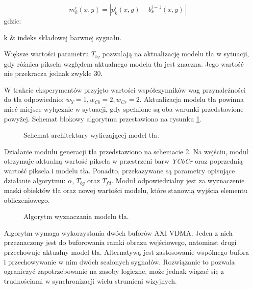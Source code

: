 \begin{enumerate}
	\begin{equation}
	\label{eq:background-model-background-mask-2}
	m^i_k(x,y) = | p^i_k(x,y) - b^{i-1}_k(x,y)|
	\end{equation}
	gdzie:
	\begin{conditions}
		k & indeks składowej barwnej sygnału. \\ 
	\end{conditions}
	
	Większe wartości parametru $T_{bg}$ pozwalają na aktualizację modelu tła w sytuacji, gdy różnica piksela względem aktualnego modelu tła jest znaczna. 
	Jego wartość nie przekracza jednak zwykle $30$.
\end{enumerate}

W trakcie eksperymentów przyjęto wartości współczynników wag przynależności do tła odpowiednio: $w_Y=1, w_{Cb} = 2, w_{Cr} = 2$.
Aktualizacja modelu tła powinna mieć miejsce wyłącznie w sytuacji, gdy spełnione są oba warunki przedstawione powyżej.
Schemat blokowy algorytmu przestawiono na rysunku \ref{fig:background-model}.

\begin{figure}[h]
	\centering
	\def\svgwidth{\textwidth}
	
	\caption{Schemat architektury wyliczającej model tła.}
	\label{fig:background-model}
\end{figure}


Działanie modułu generacji tła przedstawiono na schemacie \ref{fig:background-model-impl}. 
Na wejściu, moduł otrzymuje aktualną wartość piksela w przestrzeni barw \textit{YCbCr} oraz poprzednią wartość piksela i modelu tła. 
Ponadto, przekazywane są parametry opisujące działanie algorytmu: $\alpha$, $T_{bg}$ oraz $T_{fd}$. 
Moduł odpowiedzialny jest za wyznaczenie maski obiektów tła oraz nowej wartości modelu, które stanowią wyjścia elementu obliczeniowego.

\begin{figure}[h]
	\centering
	\def\svgwidth{\textwidth}
	
	\caption{Algorytm wyznaczania modelu tła.}
	\label{fig:background-model-impl}
\end{figure}

Algorytm wymaga wykorzystania dwóch buforów AXI VDMA. 
Jeden z nich przeznaczony jest do buforowania ramki obrazu wejściowego, natomiast drugi przechowuje aktualny model tła. 
Alternatywą jest zastosowanie wspólnego bufora i przechowywanie w nim dwóch scalonych sygnałów. 
Rozwiązanie to pozwala ograniczyć zapotrzebowanie na zasoby logiczne, może jednak wiązać się z trudnościami w synchronizacji wielu strumieni wizyjnych.

